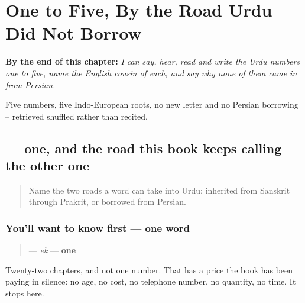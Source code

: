 
\chapter{One to Five, By the Road Urdu Did Not Borrow}
\label{ch:ur-count-five}

\begin{chapteropening}
\textbf{By the end of this chapter:} \emph{I can say, hear, read and write the Urdu numbers one to five, name the English cousin of each, and say why none of them came in from Persian.}

Five numbers, five Indo-European roots, no new letter and no Persian borrowing -- retrieved shuffled rather than recited.
\end{chapteropening}

\section[\texorpdfstring{\ur{ایک} (ek)}{ایک (ek)}]{ — one, and the road this book keeps calling the other one}

\label{lesson:UR-C28-ek}



\begin{quote}
Name the two roads a word can take into Urdu: inherited from Sanskrit through Prakrit, or borrowed from Persian.
\end{quote}

\subsection*{You'll want to know first — one word}
\begin{quote}
\textbf{} — \emph{ek} — \textbf{one}
\end{quote}

Twenty-two chapters, and not one number. That has a price the book has been paying in silence: no age, no cost, no telephone number, no quantity, no time. It stops here.

